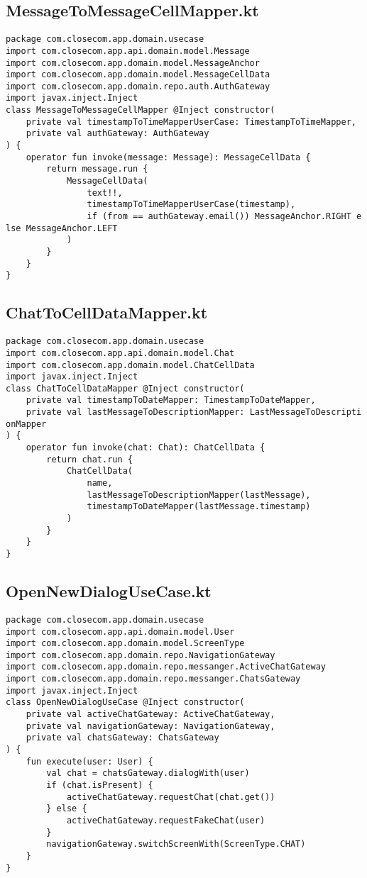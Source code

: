 \documentclass[listing]{espd}
\begin{document}
\subsection{MessageToMessageCellMapper.kt}
\begin{verbatim}
package com.closecom.app.domain.usecase
import com.closecom.app.api.domain.model.Message
import com.closecom.app.domain.model.MessageAnchor
import com.closecom.app.domain.model.MessageCellData
import com.closecom.app.domain.repo.auth.AuthGateway
import javax.inject.Inject
class MessageToMessageCellMapper @Inject constructor(
    private val timestampToTimeMapperUserCase: TimestampToTimeMapper,
    private val authGateway: AuthGateway
) {
    operator fun invoke(message: Message): MessageCellData {
        return message.run {
            MessageCellData(
                text!!,
                timestampToTimeMapperUserCase(timestamp),
                if (from == authGateway.email()) MessageAnchor.RIGHT e
lse MessageAnchor.LEFT
            )
        }
    }
}
\end{verbatim}

\subsection{ChatToCellDataMapper.kt}
\begin{verbatim}
package com.closecom.app.domain.usecase
import com.closecom.app.api.domain.model.Chat
import com.closecom.app.domain.model.ChatCellData
import javax.inject.Inject
class ChatToCellDataMapper @Inject constructor(
    private val timestampToDateMapper: TimestampToDateMapper,
    private val lastMessageToDescriptionMapper: LastMessageToDescripti
onMapper
) {
    operator fun invoke(chat: Chat): ChatCellData {
        return chat.run {
            ChatCellData(
                name,
                lastMessageToDescriptionMapper(lastMessage),
                timestampToDateMapper(lastMessage.timestamp)
            )
        }
    }
}
\end{verbatim}

\subsection{OpenNewDialogUseCase.kt}
\begin{verbatim}
package com.closecom.app.domain.usecase
import com.closecom.app.api.domain.model.User
import com.closecom.app.domain.model.ScreenType
import com.closecom.app.domain.repo.NavigationGateway
import com.closecom.app.domain.repo.messanger.ActiveChatGateway
import com.closecom.app.domain.repo.messanger.ChatsGateway
import javax.inject.Inject
class OpenNewDialogUseCase @Inject constructor(
    private val activeChatGateway: ActiveChatGateway,
    private val navigationGateway: NavigationGateway,
    private val chatsGateway: ChatsGateway
) {
    fun execute(user: User) {
        val chat = chatsGateway.dialogWith(user)
        if (chat.isPresent) {
            activeChatGateway.requestChat(chat.get())
        } else {
            activeChatGateway.requestFakeChat(user)
        }
        navigationGateway.switchScreenWith(ScreenType.CHAT)
    }
}
\end{verbatim}
\end{document}
